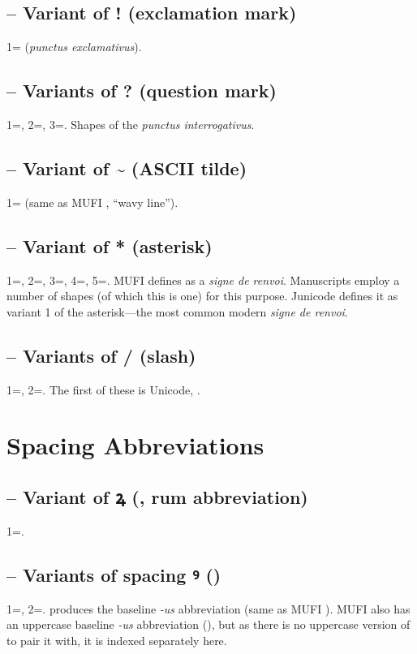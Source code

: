 \subsection{ – Variant of ! (exclamation mark)}
1= (\textit{punctus exclamativus}).

\subsection{
– Variants of ? (question mark)}
1=, 2=, 3=. Shapes of the \textit{punctus interrogativus}.

\subsection{
– Variant of \~{} (ASCII tilde)}
1= (same as MUFI , “wavy line”).

\subsection{ –
Variant of * (asterisk)}
1=, 2=, 3=, 4=, 5=.
MUFI defines  as a \textit{signe de renvoi}. Manuscripts employ a number of shapes (of which this is one) for
this purpose. Junicode defines it as variant 1 of the asterisk—the most common modern \textit{signe de renvoi}.

\subsection{ – Variants of / (slash)}
1=, 2=. The first of these is Unicode, .

\section{Spacing Abbreviations}
\subsection{ – Variant of ꝝ (, rum
abbreviation)}
1=.

\subsection{ – Variants of spacing ꝰ ()}
1=, 2=.  produces the baseline \textit{{}-us} abbreviation (same as MUFI
). MUFI also has an uppercase baseline \textit{{}-us} abbreviation (), but as there is no uppercase version
of  to pair it with, it is indexed separately here.

